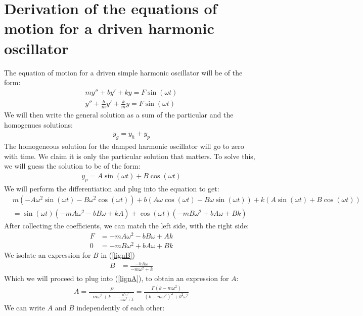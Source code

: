 \documentclass[12pt,oneside,a4paper]{article}
\numberwithin{equation}{section}
\begin{document}
{{{{\section{Derivation of the equations of motion for a driven harmonic oscillator}
The equation of motion for a driven simple harmonic oscillator will be of the form:
\begin{align*}
my'' + by' + ky = F\sin(\omega t)\\
y'' + \frac{b}{m}y' + \frac{k}{m} y = F \sin(\omega t)
\end{align*}
We will then write the general solution as a sum of the particular and the homogenues solutions:
\begin{align*}
y_g = y_{h} + y_p
\end{align*}
The homogeneous solution for the damped harmonic oscillator will go to zero with time. We claim it is only the particular solution that matters. To solve this, we will guess the solution to be of the form:
\begin{align*}
y_p = A \sin (\omega t) + B \cos(\omega t)
\end{align*}
We will perform the differentiation and plug into the equation to get:
\begin{align*}
&m\left(-A\omega^2\sin(\omega t) - B\omega^2\cos(\omega t)\right) + b\left(A\omega\cos(\omega t) - B\omega\sin(\omega t)\right) + k\left( A\sin(\omega t) + B\cos(\omega t) \right)\\
&=\sin(\omega t) \left( -mA\omega^2 -bB\omega + kA \right) + \cos(\omega t)\left(-mB\omega^2 + bA\omega + Bk\right)
\end{align*}
After collecting the coefficients, we can match the left side, with the right side:
\begin{align}
F &= -mA\omega^2 -bB\omega + Ak \label{lignA} \\ 
0 &= -mB\omega^2 + bA\omega + Bk \label{lignB}
\end{align}
We isolate an expression for $B$ in (\ref{lignB})
\begin{align*}
B &= \frac{-bA\omega}{-m\omega^2+k}
\end{align*}
Which we will proceed to plug into (\ref{lignA}), to obtain an expression for $A$:
\begin{align*}
A = \frac{F}{-m\omega^2+k+\frac{b^2\omega^2}{-m\omega^2+k}} = \frac{F\left(k-m\omega^2\right)}{\left(k-m\omega^2\right)^2+b^2\omega^2}
\end{align*} 
We can write $A$ and $B$ independently of each other:
\begin{align*}

\end{align*}}}}}
\end{document}
